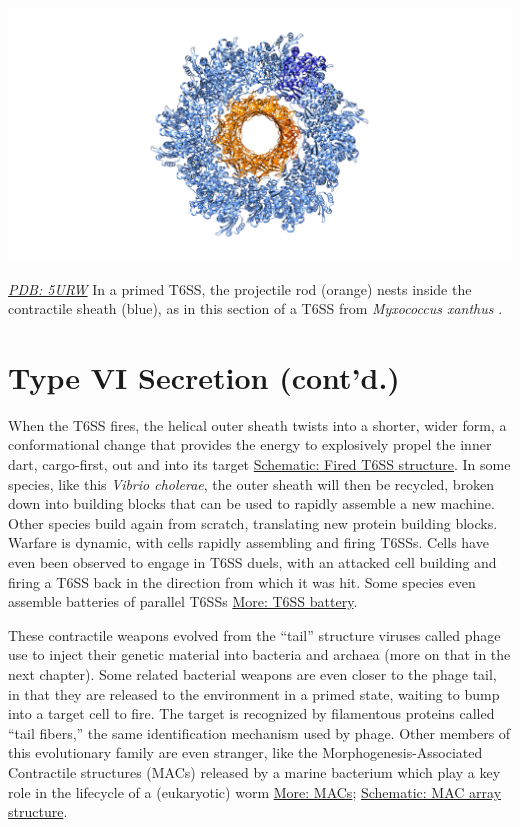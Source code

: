 \documentclass[]{tufte-book}
\begin{document}
\includegraphics{img/schematics/9_6_1}

\href{http://rcsb.org/structure/5URW}{\emph{PDB: 5URW}}
In a primed T6SS, the projectile rod (orange) nests inside the contractile sheath (blue), as in this section of a T6SS from \emph{Myxococcus xanthus} \citep{chang2017}.

\hypertarget{type-vi-secretion-contd.}{%
\section{Type VI Secretion (cont'd.)}\label{type-vi-secretion-contd.}}

When the T6SS fires, the helical outer sheath twists into a shorter, wider form, a conformational change that provides the energy to explosively propel the inner dart, cargo-first, out and into its target \protect\hyperlink{Fired_T6SS_structure}{Schematic: Fired T6SS structure}. In some species, like this \emph{Vibrio cholerae}, the outer sheath will then be recycled, broken down into building blocks that can be used to rapidly assemble a new machine. Other species build again from scratch, translating new protein building blocks. Warfare is dynamic, with cells rapidly assembling and firing T6SSs. Cells have even been observed to engage in T6SS duels, with an attacked cell building and firing a T6SS back in the direction from which it was hit. Some species even assemble batteries of parallel T6SSs \protect\hyperlink{T6SS_battery}{More: T6SS battery}.

These contractile weapons evolved from the ``tail'' structure viruses called phage use to inject their genetic material into bacteria and archaea (more on that in the next chapter). Some related bacterial weapons are even closer to the phage tail, in that they are released to the environment in a primed state, waiting to bump into a target cell to fire. The target is recognized by filamentous proteins called ``tail fibers,'' the same identification mechanism used by phage. Other members of this evolutionary family are even stranger, like the Morphogenesis-Associated Contractile structures (MACs) released by a marine bacterium which play a key role in the lifecycle of a (eukaryotic) worm \protect\hyperlink{MACs}{More: MACs}; \protect\hyperlink{MAC_array_structure}{Schematic: MAC array structure}.
\end{document}
